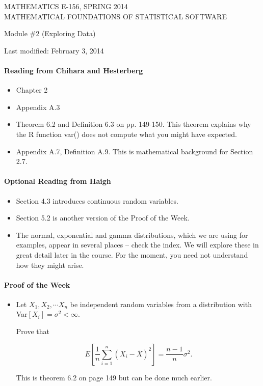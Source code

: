 \documentclass[12pt]{article}
\begin{document}
\begin{center}
MATHEMATICS E-156, SPRING 2014 \\
MATHEMATICAL FOUNDATIONS OF STATISTICAL SOFTWARE

\smallskip

Module \#2 (Exploring Data)
\end{center}

Last modified: February 3, 2014

\medskip

\paragraph*{Reading from Chihara and Hesterberg}

\begin{itemize}
\item Chapter 2

\item Appendix A.3
\item Theorem 6.2 and Definition 6.3 on pp. 149-150. This theorem explains why the R function var() does not compute what you might have expected.
\item Appendix A.7, Definition A.9. This is mathematical background for Section 2.7.
\end{itemize}

\paragraph*{Optional Reading from Haigh}

\begin{itemize}
\item Section 4.3 introduces continuous random variables.
\item Section 5.2 is another version of the Proof of the Week.
\item The normal, exponential and gamma distributions, which we are using for examples, appear in several places -- check the index. We will explore these in great detail later in the course. For the moment, you need not understand how they might arise.
\end{itemize}


\paragraph*{Proof of the Week}
\begin{itemize}
\item Let $X_1, X_2, \cdots X_n$ be independent random variables from a distribution with Var$[X_i] = \sigma^2 < \infty.$

Prove that 

$$ E[\frac{1}{n} \sum_{i=1}^n(X_i - \overline{X})^2] = \frac{n-1}{n}\sigma^2.$$

This is theorem 6.2 on page 149 but can be done much earlier.
\end{itemize}
\end{document}
